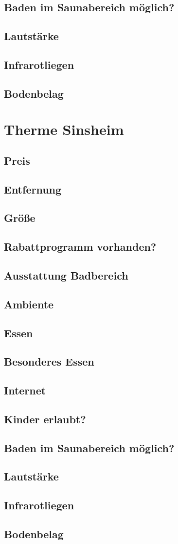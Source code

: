 \documentclass{article}
\begin{document}
\subsection*{Baden im Saunabereich möglich?}
\subsection*{Lautstärke}
\subsection*{Infrarotliegen}
\subsection*{Bodenbelag}

\section*{Therme Sinsheim}
\subsection*{Preis}
\subsection*{Entfernung}
\subsection*{Größe}
\subsection*{Rabattprogramm vorhanden?}
\subsection*{Ausstattung Badbereich}
\subsection*{Ambiente}
\subsection*{Essen}
\subsection*{Besonderes Essen}
\subsection*{Internet}
\subsection*{Kinder erlaubt?}
\subsection*{Baden im Saunabereich möglich?}
\subsection*{Lautstärke}
\subsection*{Infrarotliegen}
\subsection*{Bodenbelag}
\end{document}
